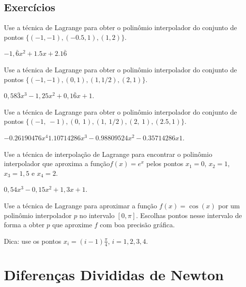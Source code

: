 \subsection*{Exercícios}

\begin{exer}
  Use a técnica de Lagrange para obter o polinômio interpolador do conjunto de pontos $\{(-1, -1), (-0.5, 1), (1, 2)\}$.
\end{exer}
\begin{resp}
  $-1,\bar{6}x^2 + 1.5x + 2.1\bar{6}$
\end{resp}

\begin{exer}
  Use a técnica de Lagrange para obter o polinômio interpolador do conjunto de pontos $\{(-1, -1), (0, 1), (1, 1/2), (2, 1)\}$.
\end{exer}
\begin{resp}
  $0,58\bar{3}x^3 - 1,25x^2 + 0,1\bar{6}x + 1$. 
\end{resp}

\begin{exer}
  Use a técnica de Lagrange para obter o polinômio interpolador do conjunto de pontos $\{(-1,~-1), (0,~1), (1,~1/2), (2,~1), (2.5, 1)\}$.
\end{exer}
\begin{resp}
  $-0.26190476x^4  1.10714286x^3 -0.98809524x^2 -0.35714286x  1$.  
\end{resp}

\begin{exer}
  Use a técnica de interpolação de Lagrange para encontrar o polinômio interpolador que aproxima a função$f(x)=e^{x}$ pelos pontos $x_1=0$, $x_2=1$, $x_3=1,5$ e $x_4=2$.
\end{exer}
\begin{resp}
$0,54x^3 - 0,15x^2 + 1,3x + 1$.
\end{resp}

\begin{exer}
  Use a técnica de Lagrange para aproximar a função $f(x) = \cos(x)$ por um polinômio interpolador $p$ no intervalo $[0, \pi]$. Escolhas pontos nesse intervalo de forma a obter $p$ que aproxime $f$ com boa precisão gráfica.
\end{exer}
\begin{resp}
  Dica: use os pontos $x_i = (i-1)\frac{\pi}{4}$, $i=1,2,3,4$.
\end{resp}

\section{Diferenças Divididas de Newton}\label{cap_interp_sec_difdiv}

